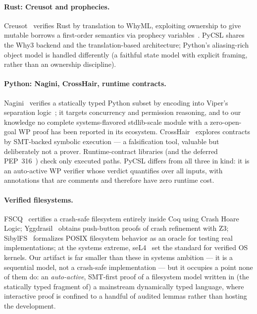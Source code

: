 \documentclass[11pt]{article}
\newcommand{\pycsl}{\textsf{PyCSL}}
\newcommand{\whyml}{\textsf{WhyML}}
\newcommand{\why}{\textsf{Why3}}
\newcommand{\zthree}{\textsf{Z3}}
\begin{document}
\paragraph{Rust: Creusot and prophecies.}
Creusot~\cite{creusot} verifies Rust by translation to \whyml{}, exploiting
ownership to give mutable borrows a first-order semantics via prophecy
variables~\cite{rusthorn}. \pycsl{} shares the \why{} backend and the
translation-based architecture; Python's aliasing-rich object model is
handled differently (a faithful state model with explicit framing, rather
than an ownership discipline).

\paragraph{Python: Nagini, CrossHair, runtime contracts.}
Nagini~\cite{nagini} verifies a statically typed Python subset by encoding
into Viper's separation logic~\cite{viper}; it targets concurrency and
permission reasoning, and to our knowledge no complete systems-flavored
stdlib-scale module with a zero-open-goal WP proof has been reported in its
ecosystem. CrossHair~\cite{crosshair} explores contracts by SMT-backed
symbolic execution --- a falsification tool, valuable but deliberately not a
prover. Runtime-contract libraries (and the deferred PEP~316~\cite{pep316})
check only executed paths. \pycsl{} differs from all three in kind: it is an
auto-active WP verifier whose verdict quantifies over all inputs, with
annotations that are comments and therefore have zero runtime cost.

\paragraph{Verified filesystems.}
FSCQ~\cite{fscq} certifies a crash-safe filesystem entirely inside Coq using
Crash Hoare Logic; Yggdrasil~\cite{yggdrasil} obtains push-button proofs of
crash refinement with \zthree{}; SibylFS~\cite{sibylfs} formalizes POSIX
filesystem behavior as an oracle for testing real implementations; at the
systems extreme, seL4~\cite{sel4} set the standard for verified OS kernels.
Our artifact is far smaller than these in systems ambition --- it is a
sequential model, not a crash-safe implementation --- but it occupies a point
none of them do: an \emph{auto-active}, SMT-first proof of a filesystem model
written in (the statically typed fragment of) a mainstream dynamically typed
language, where interactive proof is confined
to a handful of audited lemmas rather than hosting the development.
\end{document}
